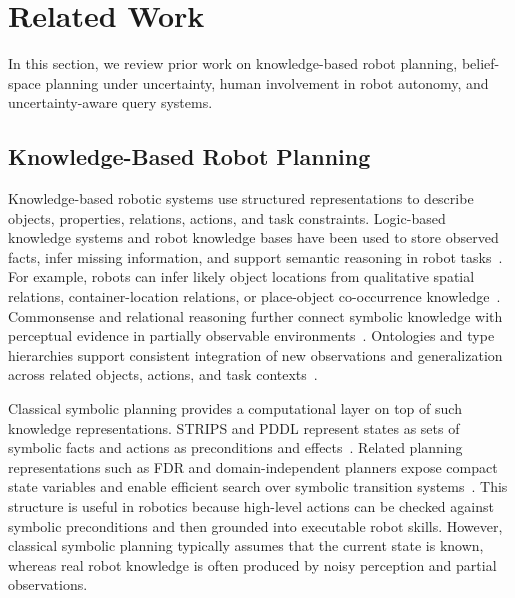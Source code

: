\section{Related Work}
\label{sec:related}

In this section, we review prior work on knowledge-based robot planning, belief-space planning under uncertainty, human involvement in robot autonomy, and uncertainty-aware query systems.

\subsection{Knowledge-Based Robot Planning}
\label{sec:related_kb}

Knowledge-based robotic systems use structured representations to describe objects, properties, relations, actions, and task constraints. Logic-based knowledge systems and robot knowledge bases have been used to store observed facts, infer missing information, and support semantic reasoning in robot tasks~\cite{tenorth2012knowledge,liu2020graph}. For example, robots can infer likely object locations from qualitative spatial relations, container-location relations, or place-object co-occurrence knowledge~\cite{kunze2014using,hasegawa2023inferring}. Commonsense and relational reasoning further connect symbolic knowledge with perceptual evidence in partially observable environments~\cite{mota2021integrated,zhang2024icorpp,daruna2019robocse}. Ontologies and type hierarchies support consistent integration of new observations and generalization across related objects, actions, and task contexts~\cite{mitrevsk2021ontology,olivares2019review,manzoor2021ontology}.

Classical symbolic planning provides a computational layer on top of such knowledge representations. STRIPS and PDDL represent states as sets of symbolic facts and actions as preconditions and effects~\cite{fikes1971strips,aeronautiques1998pddl}. Related planning representations such as FDR and domain-independent planners expose compact state variables and enable efficient search over symbolic transition systems~\cite{helmert2009concise,hoffmann2001ff,helmert2006fast,correa2024lifted}. This structure is useful in robotics because high-level actions can be checked against symbolic preconditions and then grounded into executable robot skills. However, classical symbolic planning typically assumes that the current state is known, whereas real robot knowledge is often produced by noisy perception and partial observations.

